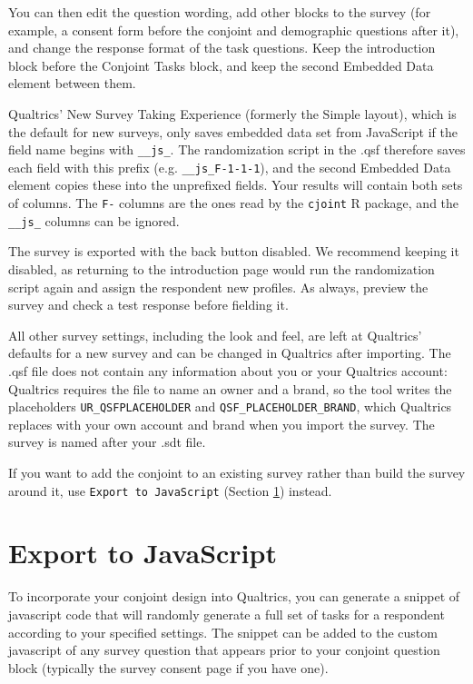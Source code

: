 \documentclass[12pt]{article}
\begin{document}
You can then edit the question wording, add other blocks to the survey (for example, a consent form before the conjoint and demographic questions after it), and change the response format of the task questions. Keep the introduction block before the Conjoint Tasks block, and keep the second Embedded Data element between them.

Qualtrics' New Survey Taking Experience (formerly the Simple layout), which is the default for new surveys, only saves embedded data set from JavaScript if the field name begins with \texttt{\_\_js\_}. The randomization script in the .qsf therefore saves each field with this prefix (e.g. \texttt{\_\_js\_F-1-1-1}), and the second Embedded Data element copies these into the unprefixed fields. Your results will contain both sets of columns. The \texttt{F-} columns are the ones read by the \texttt{cjoint} R package, and the \texttt{\_\_js\_} columns can be ignored.

The survey is exported with the back button disabled. We recommend keeping it disabled, as returning to the introduction page would run the randomization script again and assign the respondent new profiles. As always, preview the survey and check a test response before fielding it.

All other survey settings, including the look and feel, are left at Qualtrics' defaults for a new survey and can be changed in Qualtrics after importing. The .qsf file does not contain any information about you or your Qualtrics account: Qualtrics requires the file to name an owner and a brand, so the tool writes the placeholders \texttt{UR\_QSFPLACEHOLDER} and \texttt{QSF\_PLACEHOLDER\_BRAND}, which Qualtrics replaces with your own account and brand when you import the survey. The survey is named after your .sdt file.

If you want to add the conjoint to an existing survey rather than build the survey around it, use \texttt{Export to JavaScript} (Section \ref{sec:js}) instead.

\section{Export to JavaScript}\label{sec:js}

To incorporate your conjoint design into Qualtrics, you can generate a snippet of javascript code that will randomly generate a full set of tasks for a respondent according to your specified settings. The snippet can be added to the custom javascript of any survey question that appears prior to your conjoint question block (typically the survey consent page if you have one).
\end{document}
